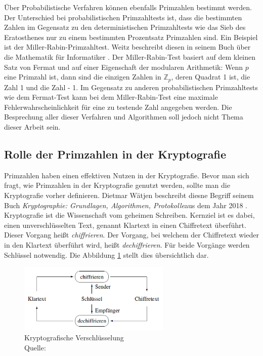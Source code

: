 Über Probabilistische Verfahren können ebenfalls Primzahlen bestimmt werden. Der Unterschied bei probabilistischen Primzahltests ist, dass die bestimmten Zahlen im Gegensatz zu den deterministischen Primzahltests wie das Sieb des Eratosthenes nur zu einem bestimmten Prozentsatz Primzahlen sind. Ein Beispiel ist der Miller-Rabin-Primzahltest. Weitz beschreibt diesen in seinem Buch über die Mathematik für Informatiker \cite[S. 97]{WEITZ.2021}. Der Miller-Rabin-Test basiert auf dem kleinen Satz von Fermat und auf einer Eigenschaft der modularen Arithmetik: Wenn $p$ eine Primzahl ist, dann sind die einzigen Zahlen in $\mathbb{Z}_p$, deren Quadrat 1 ist, die Zahl 1 und die Zahl - 1. Im Gegensatz zu anderen probabilistischen Primzahltests wie dem Fermat-Test kann bei dem Miller-Rabin-Test eine maximale Fehlerwahrscheinlichkeit für eine zu testende Zahl angegeben werden. Die Besprechung aller dieser Verfahren und Algorithmen soll jedoch nicht Thema dieser Arbeit sein.

\subsection{Rolle der Primzahlen in der Kryptografie}
Primzahlen haben einen effektiven Nutzen in der Kryptografie. Bevor man sich fragt, wie Primzahlen in der Kryptografie genutzt werden, sollte man die Kryptografie vorher definieren. Dietmar Wätjen beschreibt diesne Begriff seinem Buch \glqq\textit{Kryptographie: Grundlagen, Algorithmen, Protokolle}\grqq aus dem Jahr 2018 \cite[S. 1]{Watjen.2018}. Kryptografie ist die Wissenschaft vom geheimen Schreiben. Kernziel ist es dabei, einen unverschlüsselten Text, genannt Klartext in einen Chiffretext überführt. Dieser Vorgang heißt \textit{chiffrieren}. Der Vorgang, bei welchem der Chiffretext wieder in den Klartext überführt wird, heißt \textit{dechiffrieren}. Für beide Vorgänge werden Schlüssel notwendig. Die Abbildung \ref{fig:verschluesselung} stellt dies übersichtlich dar.

\begin{figure}[H]
    \centering
    \includegraphics[width=0.647\textwidth]{grafiken/verschluesselung.png}
    \caption[Kryptografische Verschlüsselung]{Kryptografische Verschlüsselung \\ Quelle: \cite[S. 1]{Watjen.2018}}
    \label{fig:verschluesselung}
\end{figure}

